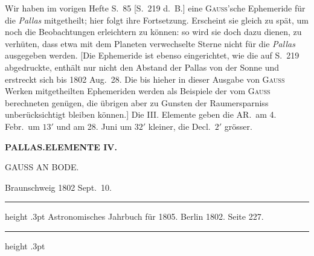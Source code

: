 Wir haben im vorigen Hefte S.\ 85 [S.\ 219 d.\ B.] eine \textsc{Gauss}'sche Ephemeride für die \textit{Pallas} mitgetheilt; hier folgt ihre Fortsetzung. Erscheint sie gleich zu spät, um noch die Beobachtungen erleichtern zu können: so wird sie doch dazu dienen, zu verhüten, dass etwa mit dem Planeten verwechselte Sterne nicht für die \textit{Pallas} ausgegeben werden. [Die Ephemeride ist ebenso eingerichtet, wie die auf S.\ 219 abgedruckte, enthält nur nicht den Abstand der Pallas von der Sonne und erstreckt sich bis 1802 Aug.\ 28. Die bis hieher in dieser Ausgabe von \textsc{Gauss} Werken mitgetheilten Ephemeriden werden als Beispiele der vom \textsc{Gauss} berechneten genügen, die übrigen aber zu Gunsten der Raumersparniss unberücksichtigt bleiben können.]
\expandafter\def\csname HistoricalNoteText21\endcsname{Die III. Elemente geben die AR.\ am 4. Febr.\ um $13'$ und am 28. Juni um $32'$ kleiner, die Decl.\ $2'$ grösser.}
\clearpage
\thispagestyle{empty}
\noindent{}%
\makebox[12mm][l]{}%
\parbox[t]{\dimexpr\linewidth-24mm\relax}{\centering\footnotesize\bfseries PALLAS.\enspace ELEMENTE IV.\par}%
\par\nobreak\medskip
{}
\begin{center}\large GAUSS AN BODE.\end{center}
\begin{flushright}Braunschweig 1802 Sept.\ 10.\end{flushright}
\begin{center}
\parbox{.75\linewidth}{%
  \centering\fontsize{8.2}{10.2}\selectfont
  \hrule height .3pt\relax\vspace{2.5pt}
  Astronomisches Jahrbuch für 1805. Berlin 1802. Seite 227.\par
  \vspace{2.5pt}\hrule height .3pt\relax
}
\end{center}

